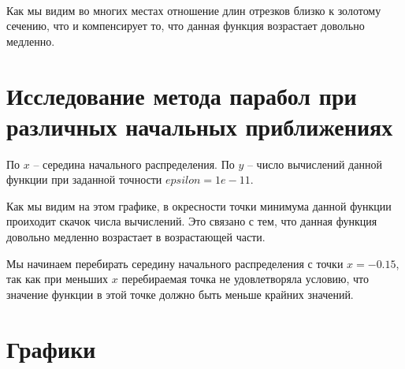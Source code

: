 
\ 

Как мы видим во многих местах отношение длин отрезков
близко к золотому сечению, что и компенсирует то, что данная
функция возрастает довольно медленно.

\section {Исследование метода парабол при различных начальных приближениях}

\begin{flushleft}
\end{flushleft}

По $x$ -- середина начального распределения. 
По $y$ -- число вычислений данной функции при заданной точности $epsilon = 1e-11$.

Как мы видим на этом графике, в окресности точки минимума данной функции проиходит скачок
числа вычислений. Это связано с тем, что данная функция довольно медленно возрастает в возрастающей части.

Мы начинаем перебирать середину начального распределения с точки $x = -0.15$, так как при
меньших $x$ перебираемая точка не удовлетворяла условию, что значение функции в этой точке
должно быть меньше крайних значений. 

\section {Графики}



